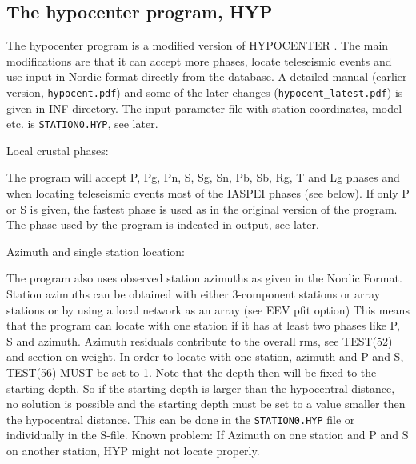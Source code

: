 
\subsection{The hypocenter program, HYP}
\label{subs:hypocenter-program} 

The hypocenter program is a modified version of HYPOCENTER 
\citep{lienert1986,lienert1991,lienert1995}. 
The main modifications are that it can accept more phases, locate 
teleseismic events and use input in Nordic format directly from the 
database. A detailed manual (earlier version, \texttt{hypocent.pdf}) 
and some of the later changes 
\newline
(\texttt{hypocent\_latest.pdf}) 
is given in INF directory. The input parameter file with station 
coordinates, model etc. is \texttt{STATION0.HYP}, see later.  

Local crustal phases: 

The program will accept P, Pg, 
Pn, S, Sg, 
Sn, Pb, Sb, Rg, T and Lg phases and 
when locating teleseismic events most of the IASPEI phases (see below). If only P or S is given, the fastest phase is used as in the original version of the program.
The phase used by the program is indcated in output, see later.%

Azimuth and single station location: 

The program also uses observed station azimuths as given in the Nordic Format. Station azimuths can be obtained with either 3-component stations or array stations or by using a local network as an array (see EEV pfit option) This means that the program can locate with one station 
if it has at least two phases like P, S and azimuth. Azimuth residuals contribute to the overall rms, see TEST(52) and section on weight.  In order to locate with one station, azimuth and P and S, TEST(56) MUST be set to 1. Note that the depth then will be fixed to 
the starting depth. So if the starting depth is larger than the 
hypocentral distance, no solution is possible and the starting 
depth must be set to a value smaller then the hypocentral distance. 
This can be done in the \texttt{STATION0.HYP} file or individually 
in the S-file. Known problem: If Azimuth on one station and P and S on another station, HYP might not locate properly.  

